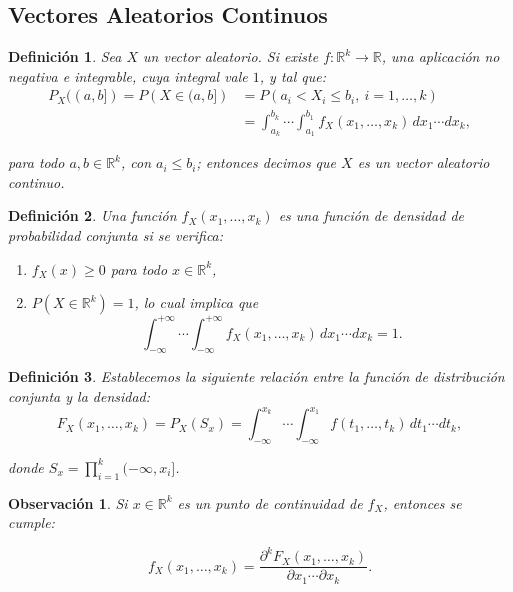 \documentclass{report}
\newtheorem{dfn}{Definición}[section]
\newtheorem{obs}{Observación}[section]
\begin{document}
\subsection{Vectores Aleatorios Continuos}
\begin{dfn}
    Sea $X$ un vector aleatorio. Si existe $f:\mathbb{R}^k\rightarrow\mathbb{R}$, una aplicación no negativa e integrable, cuya integral vale $1$, y tal que:
\[
\begin{split}
    P_X((a, b]) = P\left( X \in (a, b] \right) &= P\left( a_i < X_i \leq b_i, \ i = 1, \dots, k \right) \\
    &= \int_{a_k}^{b_k} \cdots \int_{a_1}^{b_1} f_X(x_1, \dots, x_k) \, dx_1 \cdots dx_k,
\end{split}
\]

para todo $a,b\in\mathbb{R}^k$, con $a_i\leq b_i$; entonces decimos que $X$ es un \emph{vector aleatorio continuo}. 
\end{dfn}

\begin{dfn}
Una función \( f_X(x_1, \dots, x_k) \) es una \textit{función de densidad de probabilidad conjunta} si se verifica:

\begin{enumerate}
    \item \( f_X(x) \geq 0 \) para todo \( x \in \mathbb{R}^k \),
    \item \( P(X \in \mathbb{R}^k) = 1 \), lo cual implica que
    \[
    \int_{-\infty}^{+\infty} \cdots \int_{-\infty}^{+\infty} f_X(x_1, \dots, x_k) \, dx_1 \cdots dx_k = 1.
    \]
\end{enumerate}
\end{dfn}


\begin{dfn}
   Establecemos la siguiente relación entre la función de distribución conjunta y la densidad: 
\begin{equation*}
F_X(x_1, \dots, x_k) = P_X(S_x) = \int_{-\infty}^{x_k} \cdots \int_{-\infty}^{x_1} f(t_1, \dots, t_k) \, dt_1 \cdots dt_k,
\end{equation*}

donde \( S_x = \prod_{i=1}^{k} (-\infty, x_i] \). 
\end{dfn}

\begin{obs}
Si \( x \in \mathbb{R}^k \) es un punto de continuidad de \( f_X \), entonces se cumple:

\begin{equation*}
f_X(x_1, \dots, x_k) = \frac{\partial^k F_X(x_1, \dots, x_k)}{\partial x_1 \cdots \partial x_k}.
\end{equation*} 
\end{obs}
\end{document}
